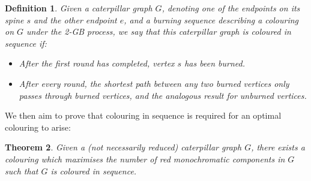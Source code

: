 \documentclass{mpaper}
\newtheorem{theorem}{Theorem}[section]
\newtheorem{definition}[theorem]{Definition}
\begin{document}
\begin{definition}
  \label{def/colour-sequence}
  Given a caterpillar graph $G$, denoting one of the endpoints on its spine $s$ and the other endpoint $e$, and a burning sequence describing a colouring on $G$ under the 2-GB process, we say that this caterpillar graph is coloured \emph{in sequence} if:
  
  \begin{itemize}
      \item After the first round has completed, vertex $s$ has been burned.
      \item After every round, the shortest path between any two burned vertices only passes through burned vertices, and the analogous result for unburned vertices.
  \end{itemize}
\end{definition}

We then aim to prove that colouring in sequence is required for an optimal colouring to arise:

\begin{theorem}
  \label{thm/sequence-optimal}
  Given a (not necessarily reduced) caterpillar graph $G$, there exists a colouring which maximises the number of red monochromatic components in $G$ such that $G$ is coloured in sequence.
\end{theorem}
\end{document}
